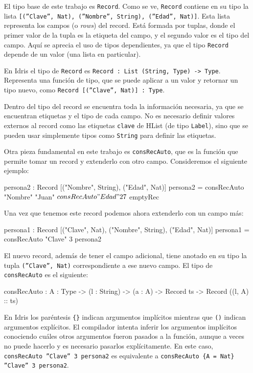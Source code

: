 El tipo base de este trabajo es \texttt{Record}. Como se ve, \texttt{Record} contiene en su tipo la lista \texttt{[(''Clave'', Nat), (''Nombre'', String), (''Edad'', Nat)]}. Esta lista representa los campos (o \textit{rows}) del record. Está formada por tuplas, donde el primer valor de la tupla es la etiqueta del campo, y el segundo valor es el tipo del campo. Aquí se aprecia el uso de tipos dependientes, ya que el tipo \texttt{Record} depende de un valor (una lista en particular).

En Idris el tipo de \texttt{Record} es \texttt{Record : List (String, Type) -> Type}. Representa una función de tipo, que se puede aplicar a un valor y retornar un tipo nuevo, como \texttt{Record [(''Clave'', Nat)] : Type}.

Dentro del tipo del record se encuentra toda la información necesaria, ya que se encuentran etiquetas y el tipo de cada campo. No es necesario definir valores externos al record como las etiquetas \texttt{clave} de HList (de tipo \texttt{Label}), sino que se pueden usar simplemente tipos como \texttt{String} para definir las etiquetas.

Otra pieza fundamental en este trabajo es \texttt{consRecAuto}, que es la función que permite tomar un record y extenderlo con otro campo. Consideremos el siguiente ejemplo:

\begin{code}
persona2 : Record [("Nombre", String), ("Edad", Nat)]
persona2 = consRecAuto "Nombre" "Juan" $
  consRecAuto "Edad" 27 $
  emptyRec
\end{code}

Una vez que tenemos este record podemos ahora extenderlo con un campo más:

\begin{code}
persona1 : Record [("Clave", Nat), ("Nombre", String),
  ("Edad", Nat)]
persona1 = consRecAuto "Clave" 3 persona2
\end{code}

El nuevo record, además de tener el campo adicional, tiene anotado en su tipo la tupla \texttt{(''Clave'', Nat)} correspondiente a ese nuevo campo. El tipo de \texttt{consRecAuto} es el siguiente:

\begin{code}
consRecAuto : {A : Type} -> (l : String) -> (a : A) ->
  Record ts -> Record ((l, A) :: ts)
\end{code}

En Idris los paréntesis \texttt{\{\}} indican argumentos implícitos mientras que \texttt{()} indican argumentos explícitos. El compilador intenta inferir los argumentos implícitos conociendo cuáles otros argumentos fueron pasados a la función, aunque a veces no puede hacerlo y es necesario pasarlos explícitamente. En este caso, \texttt{consRecAuto ''Clave'' 3 persona2} es equivalente a \texttt{consRecAuto \{A = Nat\} ''Clave'' 3 persona2}.

